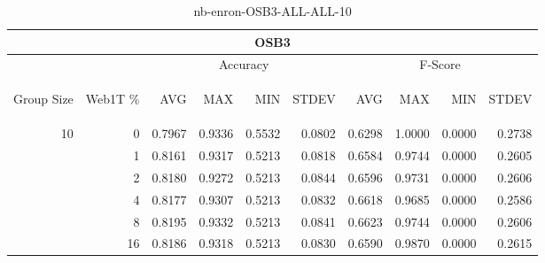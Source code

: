 \begin{center}
\begin{table}[htbp]
\begin{tabular}{ | r | r | r | r | r | r | r | r | r | r |}
\hline
\multicolumn{10}{|c|}{OSB3}\\
\hline
 & & \multicolumn{4}{|c|}{Accuracy} & \multicolumn{4}{|c|}{F-Score}\\ \cline{3-10}
\begin{sideways}Group Size\end{sideways} & \begin{sideways}Web1T \%\end{sideways} & \begin{sideways}AVG\end{sideways} & \begin{sideways}MAX\end{sideways} & \begin{sideways}MIN\end{sideways} & \begin{sideways}STDEV\end{sideways} & \begin{sideways}AVG\end{sideways} & \begin{sideways}MAX\end{sideways} & \begin{sideways}MIN\end{sideways} & \begin{sideways}STDEV\end{sideways}\\
\hline
\multirow{6}{*}{10}
 & 0 & 0.7967 & 0.9336 & 0.5532 & 0.0802 & 0.6298 & 1.0000 & 0.0000 & 0.2738\\ \cline{2-10}
 & 1 & 0.8161 & 0.9317 & 0.5213 & 0.0818 & 0.6584 & 0.9744 & 0.0000 & 0.2605\\ \cline{2-10}
 & 2 & 0.8180 & 0.9272 & 0.5213 & 0.0844 & 0.6596 & 0.9731 & 0.0000 & 0.2606\\ \cline{2-10}
 & 4 & 0.8177 & 0.9307 & 0.5213 & 0.0832 & 0.6618 & 0.9685 & 0.0000 & 0.2586\\ \cline{2-10}
 & 8 & 0.8195 & 0.9332 & 0.5213 & 0.0841 & 0.6623 & 0.9744 & 0.0000 & 0.2606\\ \cline{2-10}
 & 16 & 0.8186 & 0.9318 & 0.5213 & 0.0830 & 0.6590 & 0.9870 & 0.0000 & 0.2615\\ \cline{2-10}
\hline
\end{tabular}
\caption{nb-enron-OSB3-ALL-ALL-10}
\end{table}
\end{center}

